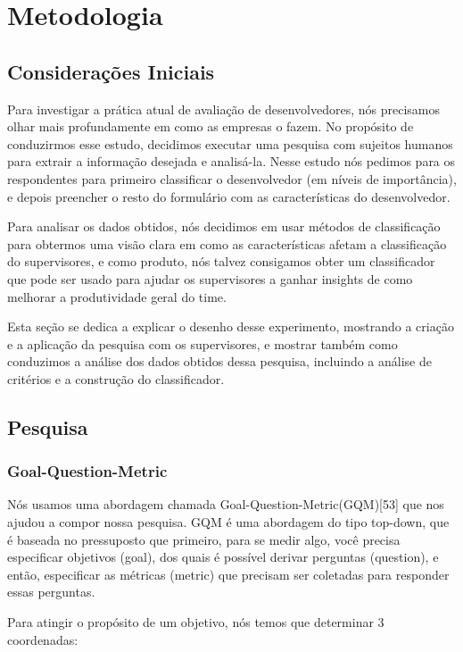 \chapter[Metodolodia]{Metodologia}

\section{Considerações Iniciais}
Para investigar a prática atual de avaliação de desenvolvedores, nós precisamos olhar mais profundamente em como as empresas o fazem. No propósito de conduzirmos esse estudo, decidimos executar uma pesquisa com sujeitos humanos para extrair a informação desejada e analisá-la. Nesse estudo nós pedimos para os respondentes para primeiro classificar o desenvolvedor (em níveis de importância), e depois preencher o resto do formulário com as características do desenvolvedor.

Para analisar os dados obtidos, nós decidimos em usar métodos de classificação para obtermos uma visão clara em como as características afetam a classificação do supervisores, e como produto, nós talvez consigamos obter um classificador que pode ser usado para ajudar os supervisores a ganhar insights de como melhorar a produtividade geral do time.

Esta seção se dedica a explicar o desenho desse experimento, mostrando a criação e a aplicação da pesquisa com os supervisores, e mostrar também como conduzimos a análise dos dados obtidos dessa pesquisa, incluindo a análise de critérios e a construção do classificador.

\section{Pesquisa}\label{secao3.2}

\subsection{Goal-Question-Metric}\label{secao3.2.1}
Nós usamos uma abordagem chamada Goal-Question-Metric(GQM)[53] que nos ajudou a compor nossa pesquisa. GQM é uma abordagem do tipo top-down, que é baseada no pressuposto que primeiro, para se medir algo, você precisa especificar objetivos (goal), dos quais é possível derivar perguntas (question), e então, especificar as métricas (metric) que precisam ser coletadas para responder essas perguntas.

Para atingir o propósito de um objetivo, nós temos que determinar 3 coordenadas:

